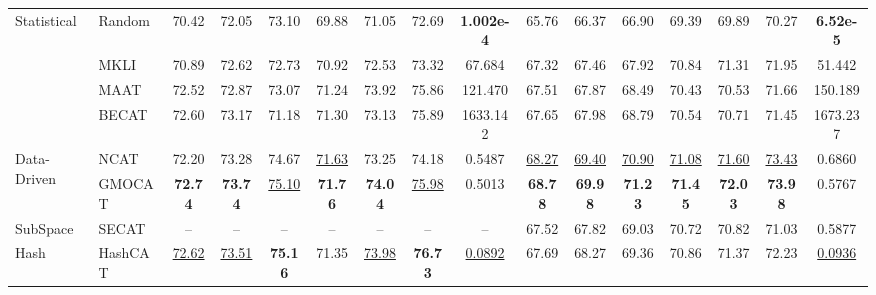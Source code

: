 \begin{table}[!t]
{\begin{tabular}{l l|ccc|ccc|c|ccc|ccc|c}
    \multirow{4}[8]{*}{Statistical} & Random 
    & 70.42 & 72.05 & 73.10 & 69.88 & 71.05 & 72.69 & \textbf{1.002e-4} & 65.76  & 66.37  & 66.90  & 69.39  & 69.89  & 70.27 & \textbf{6.52e-5} \\
    \cmidrule{3-16} & MKLI & 70.89 & 72.62 & 72.73 & 70.92 & 72.53 & 73.32 & 67.684 & 67.32 & 67.46 & 67.92 & 70.84 & 71.31 & 71.95 & 51.442 \\
    \cmidrule{3-16} & MAAT & 72.52 & 72.87 & 73.07 & 71.24 & 73.92 & 75.86 & 121.470 & 67.51 & 67.87 & 68.49 & 70.43 & 70.53 & 71.66 & 150.189 \\
    \cmidrule{3-16} & BECAT &72.60 & 73.17 & 71.18 &71.30  &73.13  & 75.89 & 1633.142 & 67.65 &67.98 & 68.79 & 70.54 &70.71 & 71.45 &  1673.237\\
    \midrule
    \multirow{2}{*}{Data-Driven} & NCAT & 72.20& 73.28&74.67 & \underline{71.63}& 73.25& 74.18& 0.5487&\underline{68.27} &\underline{69.40} & \underline{70.90}& \underline{71.08}&\underline{71.60} & \underline{73.43}& 0.6860\\
    \cmidrule{3-16} & GMOCAT &\textbf{72.74} &\textbf{73.74} &\underline{75.10} &\textbf{71.76} &\textbf{74.04} & \underline{75.98}& 0.5013&\textbf{68.78} & \textbf{69.98}&\textbf{71.23} &\textbf{71.45} & \textbf{72.03}&\textbf{73.98} &0.5767 \\
    \midrule
    SubSpace & SECAT & -- &--  & -- & -- &-- & -- & --& 67.52&67.82 & 69.03& 70.72&70.82 & 71.03&0.5877 \\
    \midrule
   Hash & HashCAT & \cellcolor{gray!25}\underline{72.62} & \cellcolor{gray!25}\underline{73.51} & \cellcolor{gray!25}\textbf{75.16} & \cellcolor{gray!25}71.35 & \cellcolor{gray!25}\underline{73.98} & \cellcolor{gray!25}\textbf{76.73} & \cellcolor{gray!25}\underline{0.0892} & \cellcolor{gray!25}67.69 & \cellcolor{gray!25}68.27 & \cellcolor{gray!25}69.36 & \cellcolor{gray!25}70.86 & \cellcolor{gray!25}71.37 & \cellcolor{gray!25}72.23 & \cellcolor{gray!25}\underline{0.0936} \\
    
    \midrule
    

\end{tabular}}
\end{table}
